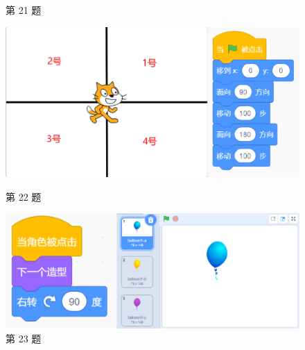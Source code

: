 \documentclass[10pt, a4paper]{article}
\begin{document}
\begin{enumerate}
\begin{figure}[htbp]
\begin{minipage}[t]{.08\textwidth}
                \caption*{第 21 题}
            \end{minipage}
            \begin{minipage}[t]{.35\textwidth}
                \centering
                \includegraphics[width=\textwidth]{22.png}
                \caption*{第 22 题}
            \end{minipage}
            \begin{minipage}[t]{.45\textwidth}
                \centering
                \includegraphics[width=\textwidth]{23.png}
                \caption*{第 23 题}
            \end{minipage}
            \begin{minipage}[t]{.1\textwidth}
                \centering

\end{minipage}
\end{figure}
\end{enumerate}
\end{document}

